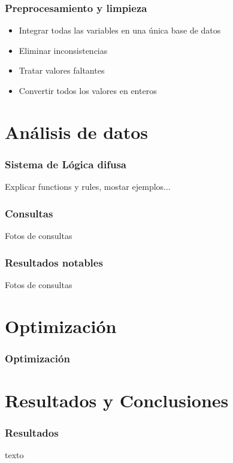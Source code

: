 \documentclass{beamer}
\newcommand{\slideauthor}[1]{\def\insertslideauthor{#1}}
\newcommand{\insertslideauthor}{}
\begin{document}
\begin{frame}
\frametitle{Preprocesamiento y limpieza}
\slideauthor{Autor 2}
\begin{itemize}
    \item Integrar todas las variables en una única base de datos
    \item Eliminar inconsistencias
    \item Tratar valores faltantes
    \item Convertir todos los valores en enteros
\end{itemize}
\end{frame}

\section{Análisis de datos}
\begin{frame}
\frametitle{Sistema de Lógica difusa}
\slideauthor{Autor 2}
Explicar functions y rules, mostar ejemplos...
\end{frame}
\begin{frame}
\frametitle{Consultas}
\slideauthor{Autor 2}
Fotos de consultas
\end{frame}
\begin{frame}
\frametitle{Resultados notables}
\slideauthor{Autor 2}
Fotos de consultas
\end{frame}

\section{Optimización}
\begin{frame}
\frametitle{Optimización}
\slideauthor{Autor 2}

\end{frame}

\section{Resultados y Conclusiones}
\begin{frame}
\frametitle{Resultados}
\slideauthor{Autor 2}
texto
\end{frame}
\end{document}
